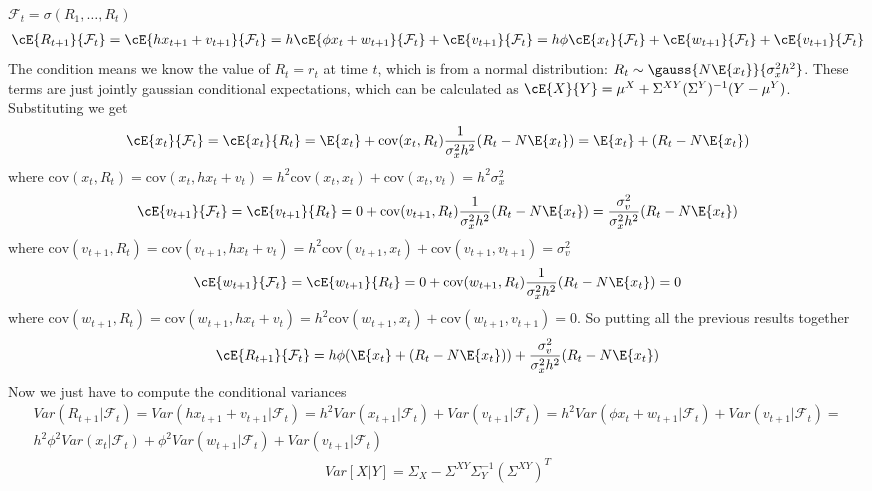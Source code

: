$\mathcal{F}_t = \sigma(R_1,\ldots,R_t )$
\begin{gather*}
\cE{R_{t+1}}{\mathcal{F}_t} = \cE{hx_{t+1}+v_{t+1}}{\mathcal{F}_t} = h \cE{\phi x_t + w_{t+1}}{\mathcal{F}_t} + \cE{v_{t+1}}{\mathcal{F}_t} =
h \phi \cE{x_t}{\mathcal{F}_t} + \cE{w_{t+1}}{\mathcal{F}_t} + \cE{v_{t+1}}{\mathcal{F}_t} 
\end{gather*}
The condition means we know the value of $R_t=r_t$ at time $t$, which is from a normal distribution: $R_t \sim \gauss{N\E{x_t}}{\sigma^2_xh^2}$. These terms are just jointly gaussian conditional expectations, which can be calculated as $\cE{X}{Y}= \mu^{X}+\Sigma^{XY}(\Sigma^{Y})^{-1}(Y-\mu^{Y})$. Substituting we get
\begin{gather*}
    \cE{x_t}{\mathcal{F}_t}=\cE{x_t}{R_t}=\E{x_t}+\text{cov}(x_t,R_t)\frac{1}{\sigma_x^2h^2}(R_t-N \E{x_t}) = \E{x_t}+(R_t-N \E{x_t})
\end{gather*}
where $\text{cov}(x_t,R_t)=\text{cov}(x_t,hx_t+v_t)=h^2 \text{cov}(x_t,x_t)+\text{cov}(x_t,v_t)=h^2\sigma_x^2$
\begin{gather*}
    \cE{v_{t+1}}{\mathcal{F}_t}=\cE{v_{t+1}}{R_t} = 0 + \text{cov}(v_{t+1},R_t) \frac{1}{\sigma_x^2h^2}(R_t-N\E{x_t})=\frac{\sigma_v^2}{\sigma_x^2h^2}(R_t-N\E{x_t})
\end{gather*}
where $\text{cov}(v_{t+1},R_t)=\text{cov}(v_{t+1},hx_t+v_t)=h^2 \text{cov}(v_{t+1},x_t)+\text{cov}(v_{t+1},v_{t+1})=\sigma_v^2$
\begin{gather*}
    \cE{w_{t+1}}{\mathcal{F}_t}=\cE{w_{t+1}}{R_t} = 0 + \text{cov}(w_{t+1},R_t) \frac{1}{\sigma_x^2h^2}(R_t-N\E{x_t}) = 0
\end{gather*}
where $\text{cov}(w_{t+1},R_t)=\text{cov}(w_{t+1},hx_t+v_t)=h^2 \text{cov}(w_{t+1},x_t)+\text{cov}(w_{t+1},v_{t+1})= 0$.
So putting all the previous results together
\begin{gather*}
    \cE{R_{t+1}}{\mathcal{F}_t} = h\phi (\E{x_t} + (R_t-N \E{x_t})) + \frac{\sigma_v^2}{\sigma_x^2h^2}(R_t-N\E{x_t})
\end{gather*}
Now we just have to compute the conditional variances
\begin{gather*}
 Var(R_{t+1}|\mathcal{F}_t) = Var(hx_{t+1}+v_{t+1}|\mathcal{F}_t)=h^2 Var(x_{t+1}| \mathcal{F}_t)+Var(v_{t+1}|\mathcal{F}_t)= h^2 Var(\phi x_t + w_{t+1}| \mathcal{F}_t)+Var(v_{t+1}|\mathcal{F}_t) = \\ 
 h^2 \phi^2 Var( x_t| \mathcal{F}_t)+\phi^2 Var(w_{t+1}|\mathcal{F}_t)+Var(v_{t+1}|\mathcal{F}_t)
\end{gather*}
\begin{gather*}
    Var[X|Y] = \Sigma_{X} - \Sigma^{XY}\Sigma_{Y}^{-1}(\Sigma^{XY})^{T}
\end{gather*}
